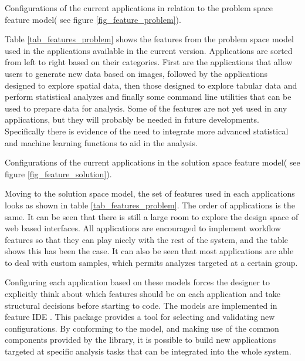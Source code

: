 \begin{table}
\scriptsize
	
\caption{\label{tab_features_problem} Configurations of the current applications in relation to the problem space feature model( see figure \ref{fig_feature_problem}).}
\end{table}

Table \ref{tab_features_problem} shows the features from the problem space model used in the applications available in the current version. Applications are sorted from left to right based on their categories. First are the applications that allow users to generate new data based on images, followed by the applications designed to explore spatial data, then those designed to explore tabular data and perform statistical analyzes and finally some command line utilities that can be used to prepare data for analysis. Some of the features are not yet used in any applications, but they will probably be needed in future developments. Specifically there is evidence of the need to integrate more advanced statistical and machine learning functions to aid in the analysis. 

\begin{table}
\scriptsize
	
\caption{ \label{tab_features_solution} Configurations of the current applications in the solution space feature model( see figure \ref{fig_feature_solution}).}
\end{table}


Moving to the solution space model, the set of features used in each applications looks as shown in table \ref{tab_features_problem}. The order of applications is the same. It can be seen that there is still a large room to explore the design space of web based interfaces. All applications are encouraged to implement workflow features so that they can play nicely with the rest of the system, and the table shows this has been the case. It can also be seen that most applications are able to deal with custom samples, which permits analyzes targeted at a certain group.

Configuring each application based on these models forces the designer to explicitly think about which features should be on each application and take structural decisions before starting to code. The models are implemented in feature IDE \autocite{thum_featureide:_2014}. This package provides a tool for selecting and validating new configurations. By conforming to the model, and making use of the common components provided by the library, it is possible to build new applications targeted at specific analysis tasks that can be integrated into the whole system.


